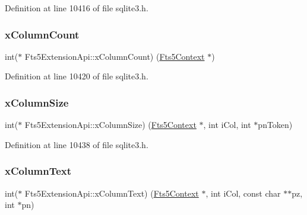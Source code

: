 Definition at line 10416 of file sqlite3.\+h.

\mbox{\label{struct_fts5_extension_api_a427409c50da4e179c8f2d36b22a4ba21}} 
\subsubsection{\texorpdfstring{x\+Column\+Count}{xColumnCount}}
{\footnotesize\ttfamily int($\ast$ Fts5\+Extension\+Api\+::x\+Column\+Count) (\mbox{\hyperlink{sqlite3_8h_a97821b95ebebd43db901977ffd5b26bc}{Fts5\+Context}} $\ast$)}



Definition at line 10420 of file sqlite3.\+h.

\mbox{\label{struct_fts5_extension_api_aefe6eb4685546e58f056a61da39a2bcb}} 
\subsubsection{\texorpdfstring{x\+Column\+Size}{xColumnSize}}
{\footnotesize\ttfamily int($\ast$ Fts5\+Extension\+Api\+::x\+Column\+Size) (\mbox{\hyperlink{sqlite3_8h_a97821b95ebebd43db901977ffd5b26bc}{Fts5\+Context}} $\ast$, int i\+Col, int $\ast$pn\+Token)}



Definition at line 10438 of file sqlite3.\+h.

\mbox{\label{struct_fts5_extension_api_a03c7fcd31a751fc34d25e5288045f91d}} 
\subsubsection{\texorpdfstring{x\+Column\+Text}{xColumnText}}
{\footnotesize\ttfamily int($\ast$ Fts5\+Extension\+Api\+::x\+Column\+Text) (\mbox{\hyperlink{sqlite3_8h_a97821b95ebebd43db901977ffd5b26bc}{Fts5\+Context}} $\ast$, int i\+Col, const char $\ast$$\ast$pz, int $\ast$pn)}



